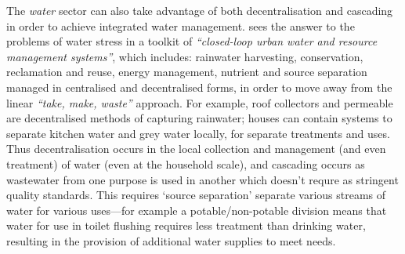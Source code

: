 The \emph{water} sector can also take advantage of both decentralisation and cascading in order to achieve integrated water management. \citet[p. 809]{Daigger2009} sees the answer to the problems of water stress in a toolkit of \emph{``closed-loop urban water and resource management systems''}, which includes: rainwater harvesting, conservation, reclamation and reuse, energy management, nutrient and source separation managed in centralised and decentralised forms, in order to move away from the linear \emph{``take, make, waste''} approach. For example, roof collectors and permeable are decentralised methods of capturing rainwater; houses can contain systems to separate kitchen water and grey water locally, for separate treatments and uses. Thus decentralisation occurs in the local collection and management (and even treatment) of water (even at the household scale), and cascading occurs as wastewater from one purpose is used in another which doesn't requre as stringent quality standards. This requires `source separation' separate various streams of water for various uses---for example a potable/non-potable division means that water for use in toilet flushing requires less treatment than drinking water, resulting in the provision of additional water supplies to meet needs.

